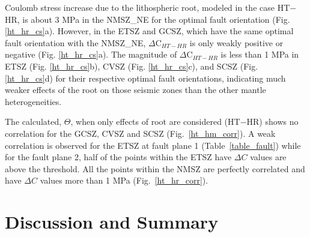 \documentclass[draft,linenumbers]{agujournal2018}
\begin{document}
Coulomb stress increase due to the lithospheric root, modeled in the case HT$-$HR, is about 3 MPa in the NMSZ\_NE for the optimal fault orientation (Fig. \ref{ht_hr_cs}a). However, in the ETSZ and GCSZ, which have the same optimal fault orientation with the NMSZ\_NE, $\Delta $C$_{HT-HR}$ is only weakly positive or negative (Fig. \ref{ht_hr_cs}a). The magnitude of $\Delta $C$_{HT-HR}$ is less than 1 MPa in ETSZ (Fig. \ref{ht_hr_cs}b), CVSZ (Fig. \ref{ht_hr_cs}c), and SCSZ (Fig. \ref{ht_hr_cs}d) for their respective optimal fault orientations, indicating much weaker effects of the root on those seismic zones than the other mantle heterogeneities. 
%

The calculated, $\Theta$, when only effects of root are considered (HT$-$HR) shows no correlation for the GCSZ, CVSZ and SCSZ (Fig.~\ref{ht_hm_corr}). A weak correlation is observed for the ETSZ at fault plane 1 (Table~\ref{table_fault}) while for the fault plane 2, half of the points within the ETSZ have $\Delta C$  values are above the threshold. All the points within the NMSZ are perfectly correlated and have $\Delta C$ values more than 1 MPa (Fig.~\ref{ht_hr_corr}).
%

    
\section{Discussion and Summary}
    
    
\end{document}
